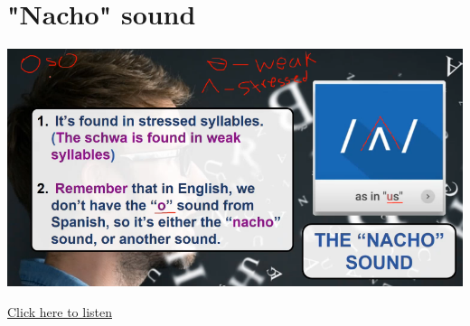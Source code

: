 \section{"Nacho" sound \textipa{/\textturnv/}}
\begin{center}
\includegraphics[width=1\textwidth]{images/nacho_portrait.png}
\end{center}

\href{https://drive.google.com/file/d/1YvsXjjdsH54Ibnmu6o0RFniyT1CjNxCH/view?usp=drive_link}{Click here to listen}


